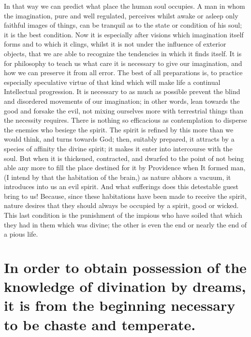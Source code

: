 \documentclass[12pt]{article}
\begin{document}
In that way we can predict what place the human soul occupies. A man in whom
the imagination, pure and well regulated, perceives whilst awake or asleep only
faithful images of things, can be tranquil as to the state or condition of his
soul; it is the best condition. Now it is especially after visions which
imagination itself forms and to which it clings, whilst it is not under the
influence of exterior objects, that we are able to recognize the tendencies in
which it finds itself. It is for philosophy to teach us what care it is
necessary to give our imagination, and how we can preserve it from all error.
The best of all preparations is, to practice especially speculative virtue of
that kind which will make life a continual Intellectual progression. It is
necessary to as much as possible prevent the blind and disordered movements of
our imagination; in other words, lean towards the good and forsake the evil,
not mixing ourselves more with terrestrial things than the necessity requires.
There is nothing so efficacious as contemplation to disperse the enemies who
besiege the spirit. The spirit is refined by this more than we would think, and
turns towards God; then, suitably prepared, it attracts by a species of
affinity the divine spirit; it makes it enter into intercourse with the soul.
But when it is thickened, contracted, and dwarfed to the point of not being
able any more to fill the place destined for it by Providence when It formed
man, (I intend by that the habitation of the brain,) as nature abhors a vacuum,
it introduces into us an evil spirit. And what sufferings does this detestable
guest bring to us! Because, since these habitations have been made to receive
the spirit, nature desires that they should always be occupied by a spirit,
good or wicked. This last condition is the punishment of the impious who have
soiled that which they had in them which was divine; the other is even the end
or nearly the end of a pious life.


\section{In order to obtain possession of the knowledge of divination by
dreams, it is from the beginning necessary to be chaste and temperate.}
\end{document}

